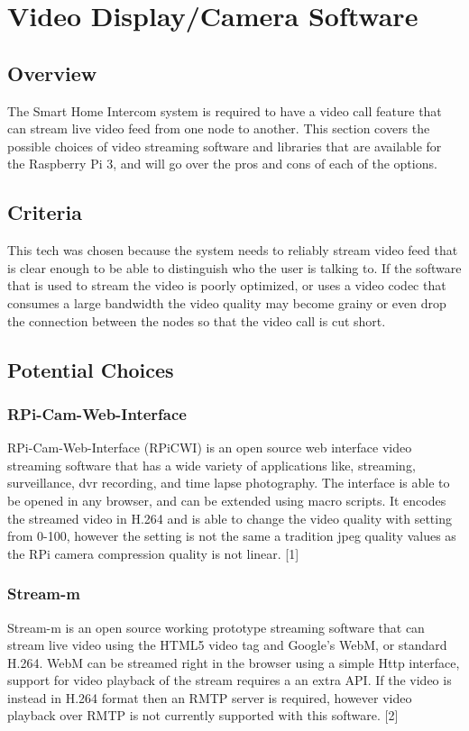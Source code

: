 \documentclass[onecolumn, draftclsnofoot,10pt, compsoc]{IEEEtran}
\begin{document}
\clearpage

\section{Video Display/Camera Software}

\subsection{Overview}
The Smart Home Intercom system is required to have a video call feature that can stream live video feed from one node to another. 
This section covers the possible choices of video streaming software and libraries that are available for the Raspberry Pi 3, and will go over the pros and cons of each of the options.

\subsection{Criteria}
 This tech was chosen because the system needs to reliably stream video feed that is clear enough to be able to distinguish who the user is talking to. 
 If the software that is used to stream the video is poorly optimized, or uses a video codec that consumes a large bandwidth the video quality may become grainy or even drop the connection between the nodes so that the video call is cut short.

\subsection{Potential Choices}


\subsubsection{RPi-Cam-Web-Interface}
RPi-Cam-Web-Interface (RPiCWI) is an open source web interface video streaming software that has a wide variety of applications like, streaming, surveillance, dvr recording, and time lapse photography. The interface is able to be opened in any browser, and can be extended using macro scripts. It encodes the streamed video in H.264 and is able to change the video quality with setting from 0-100, however the setting is not the same a tradition jpeg quality values as the RPi camera compression quality is not linear. [1] 



\subsubsection{Stream-m}
Stream-m is an open source working prototype streaming software that can stream live video using the HTML5 video tag and Google's WebM, or standard H.264. WebM can be streamed right in the browser using a simple Http interface, support for video playback of the stream requires a an extra API. If the video is instead in H.264 format then an RMTP server is required, however video playback over RMTP is not currently supported with this software. [2]
\end{document}
